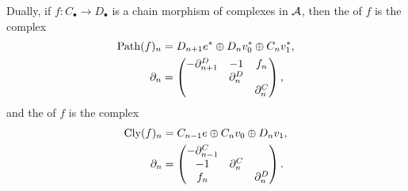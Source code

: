 {Dually, if $f\colon C_{\bullet}\to D_{\bullet}$ 
is a chain morphism of complexes in ${\cal A}$, then 
the  of $f$ 
is the complex 
\begin{align*}
\mathrm{Path}(f)_n &= 
D_{n+1}e^{\ast}\oplus D_nv_0^{\ast}\oplus C_nv_1^{\ast}, \\
\partial_n &= 
\begin{pmatrix}
-\partial^D_{n+1} & -1 & f_n \\
 & \partial^D_n & \\
 &  & \partial^C_n
\end{pmatrix},
\end{align*}
and the  of $f$ 
is the complex 
\begin{align*}
\mathrm{Cly}(f)_n &= 
C_{n-1}e\oplus C_nv_0\oplus D_nv_1, \\
\partial_n &= 
\begin{pmatrix}
-\partial^C_{n-1} & & \\
-1 & \partial^C_n & \\
f_n &  & \partial^D_n
\end{pmatrix}.
\end{align*}

}

